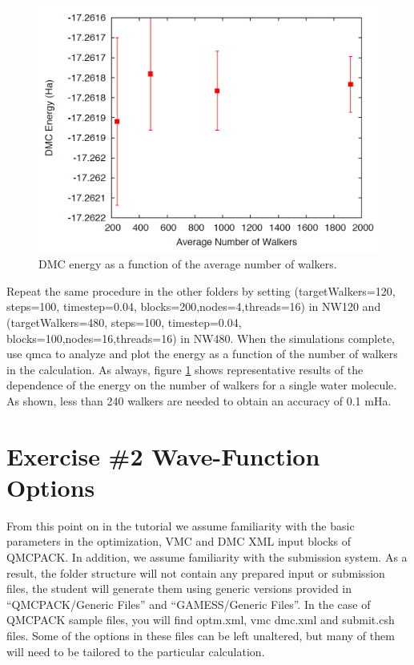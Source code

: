 \begin{figure}
\begin{center}
\includegraphics[trim = 0mm 0mm 0mm 0mm, clip,width=0.75\columnwidth]{./figures/lab_advanced_molecules_dmc_popcont}
\end{center}
\caption{DMC energy as a function of the average number of walkers.
\label{fig:lam_dmc_popcont}
}
\end{figure}

Repeat the same procedure in the other folders by setting (targetWalkers=120,
steps=100, timestep=0.04, blocks=200,nodes=4,threads=16) in NW120 and (targetWalkers=480, 
steps=100, timestep=0.04, blocks=100,nodes=16,threads=16) in NW480. When
the simulations complete, use qmca to analyze and plot the energy as a function of the
number of walkers in the calculation. As always, figure \ref{fig:lam_dmc_popcont} 
shows representative results of the
dependence of the energy on the number of walkers for a single water molecule. As shown,
less than 240 walkers are needed to obtain an accuracy of 0.1 mHa.


\section{Exercise \#2 Wave-Function Options}
From this point on in the tutorial we assume familiarity with the basic parameters in the
optimization, VMC and DMC XML input blocks of QMCPACK. In addition, we assume
familiarity with the submission system. As a result, the folder structure will not contain
any prepared input or submission files, the student will generate them using generic versions
provided in ``QMCPACK/Generic Files'' and ``GAMESS/Generic Files''. In the case of QMCPACK sample 
files, you will find optm.xml, vmc dmc.xml and submit.csh files. Some of
the options in these files can be left unaltered, but many of them will need to be tailored to
the particular calculation.

